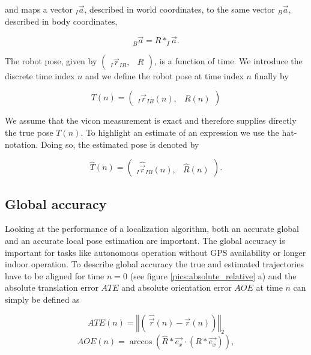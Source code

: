 and maps a vector $_I \vec{a} $, described in world coordinates, to the same vector $_B \vec{a} $, described in body coordinates,

\begin{equation}
	_B \vec{a} = R * _I \vec{a} .
\end{equation}


The robot pose, given by $ \left( \begin{array}{cc} _I \vec{r}_{IB}, & R \end{array} \right) $, is a function of time. We introduce the discrete time index $n$ and we define the robot pose at time index $n$ finally by 

\begin{equation}
	T(n) = \left( \begin{array}{cc} _I \vec{r}_{IB}(n), & R(n) \end{array} \right)
\end{equation}

We assume that the vicon measurement is exact and therefore supplies directly the true pose $T(n)$. To highlight an estimate of an expression we use the hat-notation. Doing so, the estimated pose is denoted by

\begin{equation}
	\hat{T}(n) = \left( \begin{array}{cc} _I \hat{\vec{r}}_{IB}(n), & \hat{R}(n) \end{array} \right) .
\end{equation}


\subsection{Global accuracy}
\label{sec:global}

Looking at the performance of a localization algorithm, both an accurate global and an accurate local pose estimation are important. The global accuracy is important for tasks like autonomous operation without GPS availability or longer indoor operation. To describe global accuracy the true and estimated trajectories have to be aligned for time $n=0$ (see figure \ref{pics:absolute_relative} a) and the absolute translation error $ATE$ and absolute orientation error $AOE$ at time $n$ can simply be defined as

\begin{equation}
       ATE \left( n \right) = \left\Vert\left(\ \hat{\vec{r}} \left( n \right) - \vec{r} \left( n \right) \right) \right\Vert_2
\end{equation}
\begin{equation}
       AOE \left( n \right) = \arccos \left( \hat{R} *\vec{e_{x}} \cdot\left( R *\vec{e_{x}} \right)\right) ,
\end{equation}

